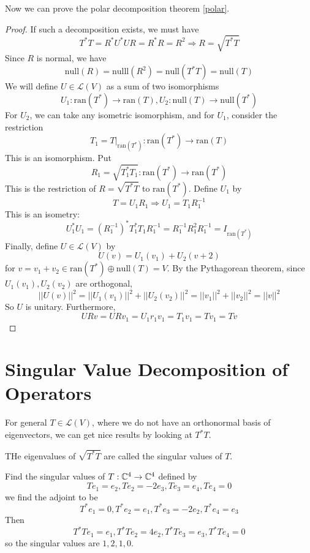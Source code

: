 \documentclass[12pt]{article}
\begin{document}
Now we can prove the polar decomposition theorem \ref{polar}.
\begin{proof}
	If such a decomposition exists, we must have
	$$T^*T = R^*U^*UR = R^*R = R^2 \Rightarrow R = \sqrt{T^*T}$$
	Since $R$ is normal, we have
	$$\text{null}(R) = \text{nulll}(R^2) = \text{null}(T^*T) = \text{null}(T)$$
	We will define $U \in \mathcal L(V)$ as a sum of two isomorphisms
	$$U_1: \text{ran}(T^*) \rightarrow \text{ran}(T), U_2: \text{null}(T) \rightarrow \text{null}(T^*)$$
	For $U_2$, we can take any isometric isomorphism, and for $U_1$, consider the restriction
	$$T_1 = T|_{\text{ran}(T^*)}:\text{ran}(T^*) \rightarrow \text{ran}(T)$$
	This is an isomorphism. Put
	$$R_1 = \sqrt{T_1^*T_1}: \text{ran}(T^*) \rightarrow \text{ran}(T^*)$$
	This is the restriction of $R = \sqrt{T^*T}$ to $\text{ran}(T^*)$. Define $U_1$ by
	$$T = U_1R_1 \Rightarrow U_1 = T_1R_1^{-1}$$
	This is an isometry:
	$$U_1^*U_1 = (R_1^{-1})^*T_1^*T_1R_1^{-1} = R_1^{-1}R_1^2R_1^{-1} = I_{\text{ran}(T^*)}$$
	Finally, define $U \in \mathcal L(V)$ by
	$$U(v) = U_1(v_1) + U_2(v+2)$$
	for $v = v_1 + v_2 \in \text{ran}(T^*) \oplus \text{null}(T) = V$. By the Pythagorean theorem, since $U_1(v_1), U_2(v_2)$ are orthogonal,
	$$||U(v)||^2 = ||U_1(v_1)||^2 + ||U_2(v_2)||^2 = ||v_1||^2 + ||v_2||^2 = ||v||^2$$
	So $U$ is unitary. Furthermore,
	$$URv = URv_1 = U_1r_1v_1 = T_1v_1 = Tv_1 = Tv$$
\end{proof}

\section{Singular Value Decomposition of Operators}

For general $T \in \mathcal L(V)$, where we do not have an orthonormal basis of eigenvectors, we can get nice results by looking at $T^*T$.

\begin{defn}
	THe eigenvalues of $\sqrt{T^*T}$ are called the singular values of $T$.
\end{defn}

\begin{ex}
	Find the singular values of $T:\mathbb{C}^4 \rightarrow \mathbb{C}^4$ defined by
	$$Te_1 = e_2, Te_2 = -2e_3, Te_3 = e_4, Te_4 = 0$$
	we find the adjoint to be
	$$T^*e_1 = 0, T^*e_2 = e_1, T^*e_3 = -2e_2, T^*e_4 = e_3$$
	Then
	$$T^*Te_1 = e_1, T^*Te_2 = 4e_2, T^*Te_3 = e_3, T^*Te_4 = 0$$
	so the singular values are $1,2,1,0$.
\end{ex}
\end{document}
